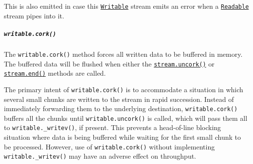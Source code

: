 This is also emitted in case this
\hyperref[class-streamwritable]{\texttt{Writable}} stream emits an error
when a \hyperref[class-streamreadable]{\texttt{Readable}} stream pipes
into it.

\begin{Shaded}
\begin{Highlighting}[]
\OperatorTok{=} \NormalTok{()}\OperatorTok{;}
\OperatorTok{=} \NormalTok{()}\OperatorTok{;}
\NormalTok{(}\OperatorTok{,}\KeywordTok{=\textgreater{}}\NormalTok{ \{}
  \NormalTok{(}\NormalTok{)}\OperatorTok{;}
\OperatorTok{,}\OperatorTok{;}
\NormalTok{\})}\OperatorTok{;}
\OperatorTok{;}
\OperatorTok{;}
\end{Highlighting}
\end{Shaded}

\subparagraph{\texorpdfstring{\texttt{writable.cork()}}{writable.cork()}}\label{writable.cork}

The \texttt{writable.cork()} method forces all written data to be
buffered in memory. The buffered data will be flushed when either the
\hyperref[writableuncork]{\texttt{stream.uncork()}} or
\hyperref[writableendchunk-encoding-callback]{\texttt{stream.end()}}
methods are called.

The primary intent of \texttt{writable.cork()} is to accommodate a
situation in which several small chunks are written to the stream in
rapid succession. Instead of immediately forwarding them to the
underlying destination, \texttt{writable.cork()} buffers all the chunks
until \texttt{writable.uncork()} is called, which will pass them all to
\texttt{writable.\_writev()}, if present. This prevents a head-of-line
blocking situation where data is being buffered while waiting for the
first small chunk to be processed. However, use of
\texttt{writable.cork()} without implementing
\texttt{writable.\_writev()} may have an adverse effect on throughput.

